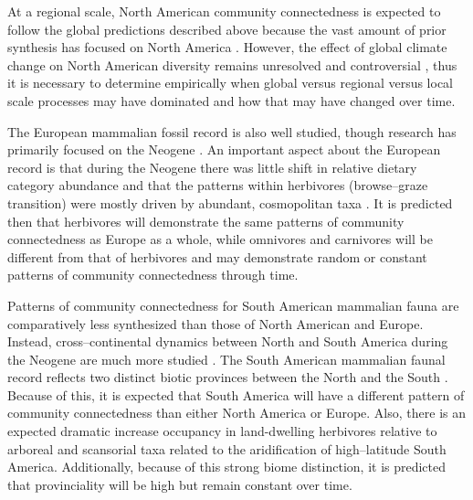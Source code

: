 \documentclass[12pt,letterpaper]{article}
\begin{document}
At a regional scale, North American community connectedness is expected to follow the global predictions described above because the vast amount of prior synthesis has focused on North America \citep{Alroy2000g,Alroy1996a,Alroy1998,Barnosky2001a,Simpson1944,Simpson1953,Badgley2013,Blois2009,Figueirido2012,Gunnell1995,Hadly2001}. However, the effect of global climate change on North American diversity remains unresolved and controversial \citep{Alroy2000g,Blois2009,Figueirido2012,Barnosky2001a}, thus it is necessary to determine empirically when global versus regional versus local scale processes may have dominated and how that may have changed over time.

The European mammalian fossil record is also well studied, though research has primarily focused on the Neogene \citep{Jernvall2002,Jernvall2004,Liow2008,Raia2006,Raia2005,Raia2011c}. An important aspect about the European record is that during the Neogene there was little shift in relative dietary category abundance \citep{Jernvall2004} and that the patterns within herbivores (browse--graze transition) were mostly driven by abundant, cosmopolitan taxa \citep{Jernvall2002}. It is predicted then that herbivores will demonstrate the same patterns of community connectedness as Europe as a whole, while omnivores and carnivores will be different from that of herbivores and may demonstrate random or constant patterns of community connectedness through time. 

Patterns of community connectedness for South American mammalian fauna are comparatively less synthesized than those of North American and Europe. Instead, cross--continental dynamics between North and South America during the Neogene are much more studied \citep{Marshall1982}. The South American mammalian faunal record reflects two distinct biotic provinces between the North and the South \citep{Macfadden1997,Macfadden2006,Flynn1998a,Patterson1968}. Because of this, it is expected that South America will have a different pattern of community connectedness than either North America or Europe. Also, there is an expected dramatic increase occupancy in land-dwelling herbivores relative to arboreal and scansorial taxa related to the aridification of high--latitude South America. Additionally, because of this strong biome distinction, it is predicted that provinciality will be high but remain constant over time. %
\end{document}
